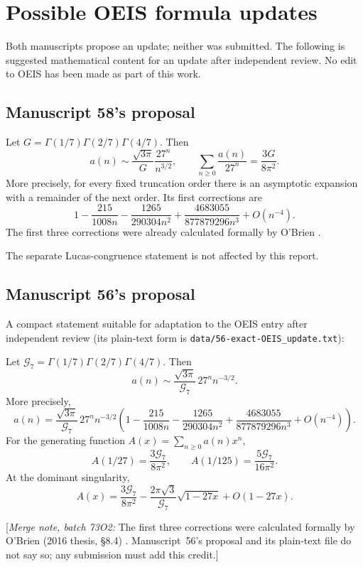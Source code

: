 \documentclass[11pt,letterpaper]{article}
\newcommand{\file}[1]{\nolinkurl{#1}}
\theoremstyle{remark}\newtheorem{remark}[theorem]{Remark}
\newcommand{\G}{\mathcal G_7}\newcommand{\Ast}{A_\star}
\newcommand{\mergenote}[1]{\textup{[}\emph{Merge note, batch 73O2:} #1\textup{]}}
\newcounter{l7gtrsavedeq}
\begin{document}
\section{Possible OEIS formula updates}\label{l7g:app:oeis}

Both manuscripts propose an update; neither was submitted. The following
is suggested mathematical content for an update after independent review.
No edit to OEIS has been made as part of this work.

\subsection{Manuscript 58's proposal}
\begin{resultbox}
Let $G=\Gamma(1/7)\Gamma(2/7)\Gamma(4/7)$. Then
\[
 a(n)\sim\frac{\sqrt{3\pi}}{G}\frac{27^n}{n^{3/2}},\qquad
 \sum_{n\ge0}\frac{a(n)}{27^n}=\frac{3G}{8\pi^2}.
\]
More precisely, for every fixed truncation order there is an asymptotic
expansion with a remainder of the next order. Its first corrections are
\[
 1-\frac{215}{1008n}-\frac{1265}{290304n^2}
   +\frac{4683055}{877879296n^3}+O(n^{-4}).
\]
The first three corrections were already calculated formally by
O'Brien \cite{l7g:obrien}.
\end{resultbox}

The separate Lucas-congruence statement is not affected by this report.

\subsection{Manuscript 56's proposal}
A compact statement suitable for adaptation to the OEIS entry after
independent review (its plain-text form is
\file{data/56-exact-OEIS_update.txt}):
\begin{resultbox}
Let
$\G=\Gamma(1/7)\Gamma(2/7)\Gamma(4/7)$. Then
\[
 a(n)\sim
 \frac{\sqrt{3\pi}}{\G}\,27^n n^{-3/2}.
\]
More precisely,
\[
 a(n)=\frac{\sqrt{3\pi}}{\G}\,27^n n^{-3/2}
 \left(1-\frac{215}{1008n}-\frac{1265}{290304n^2}
 +\frac{4683055}{877879296n^3}+O(n^{-4})\right).
\]
For the generating function $A(x)=\sum_{n\ge0}a(n)x^n$,
\[
 A(1/27)=\frac{3\G}{8\pi^2},
 \qquad
 A(1/125)=\frac{5\G}{16\pi^2}.
\]
At the dominant singularity,
\[
 A(x)=\frac{3\G}{8\pi^2}
 -\frac{2\pi\sqrt3}{\G}\sqrt{1-27x}
 +O(1-27x).
\]
\end{resultbox}
\mergenote{The first three corrections were calculated formally by
O'Brien (2016 thesis, \S8.4) \cite{l7g:obrien}. Manuscript~56's proposal
and its plain-text file do not say so; any submission must add this
credit.}
\end{document}
